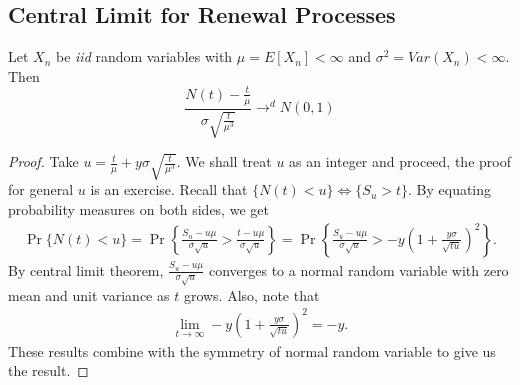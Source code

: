 \documentclass[a4paper,10pt, english]{article}
\begin{document}
\subsection{Central Limit for Renewal Processes}
\begin{thm}
Let $X_n$ be \emph{iid} random variables with $\mu = E[X_n] < \infty$ and $\sigma^2 = Var(X_n) < \infty$. Then
\[\frac{N(t)-\frac{t}{\mu}}{\sigma \sqrt{\frac{t}{\mu^3}}} \to^d N(0,1) \]
\end{thm}
\begin{proof}
Take $u = \frac{t}{\mu} + y \sigma \sqrt{\frac{t}{\mu^3}}$. We shall treat $u$ as an integer and proceed, the proof for general $u$ is an exercise. Recall that $\{N(t) < u\} \iff \{S_u > t\}$. By equating probability measures on both sides, we get
\begin{align*}
\Pr\{N(t) < u\} = \Pr\left\{\frac{S_u - u\mu}{\sigma \sqrt{u}} > \frac{t - u\mu}{\sigma \sqrt{u}}\right\} = \Pr\left\{\frac{S_u - u\mu}{\sigma \sqrt{u}} > -y\left(1 + \frac{y\sigma}{\sqrt{tu}}\right)^2\right\}.
\end{align*}
By central limit theorem, $\frac{S_u - u\mu}{\sigma \sqrt{u}}$ converges to a normal random variable with zero mean and unit variance as $t$ grows. Also, note that 
\begin{align*}
\lim_{t \to \infty} -y\left(1 + \frac{y\sigma}{\sqrt{tu}}\right)^2 = -y.
\end{align*}
These results combine with the symmetry of normal random variable to give us the result.
\end{proof}
\end{document}

